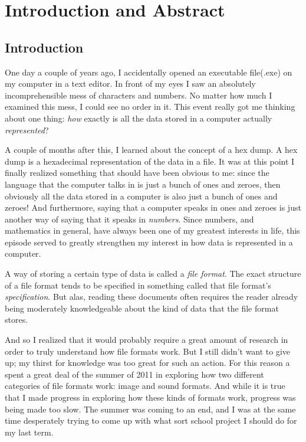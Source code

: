 \begin{comment}
  
\end{comment}

\chapter{Introduction and Abstract}

\section{Introduction}

One day a couple of years ago, I accidentally opened an executable
file(.exe) on my computer in a text editor. In front of my eyes I saw
an absolutely incomprehensible mess of characters and numbers. No
matter how much I examined this mess, I could see no order in it. This
event really got me thinking about one thing: \textit{how} exactly is
all the data stored in a computer actually \textit{represented}?

A couple of months after this, I learned about the concept of a hex
dump. A hex dump is a hexadecimal representation of the data in a
file. It was at this point I finally realized something that should
have been obvious to me: since the language that the computer talks in
is just a bunch of ones and zeroes, then obviously all the data stored
in a computer is also just a bunch of ones and zeroes! And
furthermore, saying that a computer speaks in ones and zeroes is just
another way of saying that it speaks in \textit{numbers}. Since
numbers, and mathematics in general, have always been one of my
greatest interests in life, this episode served to greatly strengthen
my interest in how data is represented in a computer.

A way of storing a certain type of data is called a \textit{file
  format}. The exact structure of a file format tends to be specified
in something called that file format's \textit{specification}. But
alas, reading these documents often requires the reader already being
moderately knowledgeable about the kind of data that the file format
stores.

And so I realized that it would probably require a great amount of
research in order to truly understand how file formats work. But I
still didn't want to give up; my thirst for knowledge was too great
for such an action.  For this reason a spent a great deal of the
summer of 2011 in exploring how two different categories of file
formats work: image and sound formats. And while it is true that I
made progress in exploring how these kinds of formats work, progress
was being made too slow. The summer was coming to an end, and I was at
the same time desperately trying to come up with what sort school
project I should do for my last term.

